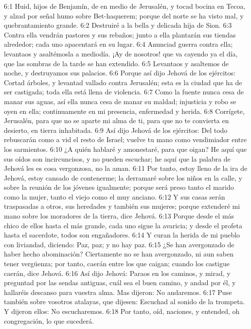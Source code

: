 6:1 Huid, hijos de Benjamín, de en medio de Jerusalén, y tocad bocina en Tecoa, y alzad por señal humo sobre Bet-haquerem; porque del norte se ha visto mal, y quebrantamiento grande. 
6:2 Destruiré a la bella y delicada hija de Sion. 
6:3 Contra ella vendrán pastores y sus rebaños; junto a ella plantarán sus tiendas alrededor; cada uno apacentará en su lugar. 
6:4 Anunciad guerra contra ella; levantaos y asaltémosla a mediodía. ¡Ay de nosotros! que va cayendo ya el día, que las sombras de la tarde se han extendido. 
6:5 Levantaos y asaltemos de noche, y destruyamos sus palacios. 
6:6 Porque así dijo Jehová de los ejércitos: Cortad árboles, y levantad vallado contra Jerusalén; esta es la ciudad que ha de ser castigada; toda ella está llena de violencia. 
6:7 Como la fuente nunca cesa de manar sus aguas, así ella nunca cesa de manar su maldad; injusticia y robo se oyen en ella; continuamente en mi presencia, enfermedad y herida. 
6:8 Corrígete, Jerusalén, para que no se aparte mi alma de ti, para que no te convierta en desierto, en tierra inhabitada. 
6:9 Así dijo Jehová de los ejércitos: Del todo rebuscarán como a vid el resto de Israel; vuelve tu mano como vendimiador entre los sarmientos. 
6:10 ¿A quién hablaré y amonestaré, para que oigan? He aquí que sus oídos son incircuncisos, y no pueden escuchar; he aquí que la palabra de Jehová les es cosa vergonzosa, no la aman. 
6:11 Por tanto, estoy lleno de la ira de Jehová, estoy cansado de contenerme; la derramaré sobre los niños en la calle, y sobre la reunión de los jóvenes igualmente; porque será preso tanto el marido como la mujer, tanto el viejo como el muy anciano. 
6:12 Y sus casas serán traspasadas a otros, sus heredades y también sus mujeres; porque extenderé mi mano sobre los moradores de la tierra, dice Jehová. 
6:13 Porque desde el más chico de ellos hasta el más grande, cada uno sigue la avaricia; y desde el profeta hasta el sacerdote, todos son engañadores. 
6:14 Y curan la herida de mi pueblo con liviandad, diciendo: Paz, paz; y no hay paz. 
6:15 ¿Se han avergonzado de haber hecho abominación? Ciertamente no se han avergonzado, ni aun saben tener vergüenza; por tanto, caerán entre los que caigan; cuando los castigue caerán, dice Jehová. 
6:16 Así dijo Jehová: Paraos en los caminos, y mirad, y preguntad por las sendas antiguas, cuál sea el buen camino, y andad por él, y hallaréis descanso para vuestra alma. Mas dijeron: No andaremos. 
6:17 Puse también sobre vosotros atalayas, que dijesen: Escuchad al sonido de la trompeta. Y dijeron ellos: No escucharemos. 
6:18 Por tanto, oíd, naciones, y entended, oh congregación, lo que sucederá. 
